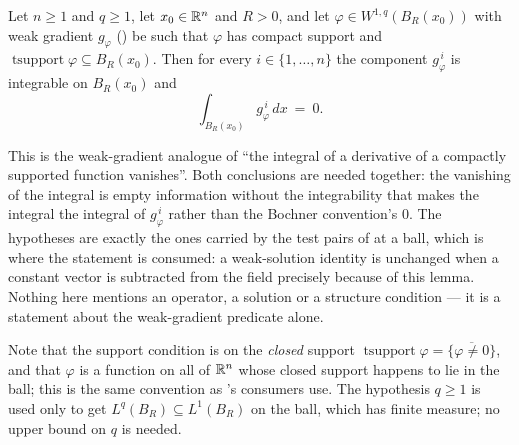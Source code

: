 \begin{lemma}
Let $n\ge1$ and $q\ge1$, let $x_0\in\mathbb{R}^n$ and $R>0$, and let
$\varphi\in W^{1,q}(B_R(x_0))$ with weak gradient $g_\varphi$
() be such that $\varphi$ has compact support and
$\operatorname{tsupport}\varphi\subseteq B_R(x_0)$.  Then for every
$i\in\{1,\dots,n\}$ the component $g_\varphi^{\,i}$ is integrable on $B_R(x_0)$
and
\[
\int_{B_R(x_0)}g_\varphi^{\,i}\,dx\ =\ 0 .
\]

This is the weak-gradient analogue of ``the integral of a derivative of a
compactly supported function vanishes''.  Both conclusions are needed together:
the vanishing of the integral is empty information without the integrability
that makes the integral the integral of $g_\varphi^{\,i}$ rather than the
Bochner convention's $0$.  The hypotheses are exactly the ones carried by the
test pairs of  at a ball, which is where the statement
is consumed: a weak-solution identity is unchanged when a constant vector is
subtracted from the field precisely because of this lemma.  Nothing here
mentions an operator, a solution or a structure condition --- it is a statement
about the weak-gradient predicate alone.

Note that the support condition is on the \emph{closed} support
$\operatorname{tsupport}\varphi=\overline{\{\varphi\ne0\}}$, and that $\varphi$
is a function on all of $\mathbb{R}^n$ whose closed support happens to lie in the ball;
this is the same convention as 's consumers use.  The
hypothesis $q\ge1$ is used only to get $L^{q}(B_R)\subseteq L^{1}(B_R)$ on the
ball, which has finite measure; no upper bound on $q$ is needed.
\end{lemma}
